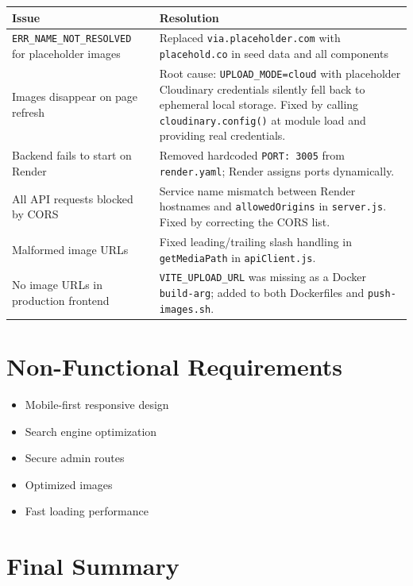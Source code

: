 \documentclass[12pt,a4paper]{article}
\begin{document}
\begin{center}
\begin{tabular}{p{5cm}p{9cm}}
\toprule
Issue & Resolution \\
\midrule
\texttt{ERR\_NAME\_NOT\_RESOLVED} for placeholder images & Replaced \texttt{via.placeholder.com} with \texttt{placehold.co} in seed data and all components \\
Images disappear on page refresh & Root cause: \texttt{UPLOAD\_MODE=cloud} with placeholder Cloudinary credentials silently fell back to ephemeral local storage. Fixed by calling \texttt{cloudinary.config()} at module load and providing real credentials. \\
Backend fails to start on Render & Removed hardcoded \texttt{PORT: 3005} from \texttt{render.yaml}; Render assigns ports dynamically. \\
All API requests blocked by CORS & Service name mismatch between Render hostnames and \texttt{allowedOrigins} in \texttt{server.js}. Fixed by correcting the CORS list. \\
Malformed image URLs & Fixed leading/trailing slash handling in \texttt{getMediaPath} in \texttt{apiClient.js}. \\
No image URLs in production frontend & \texttt{VITE\_UPLOAD\_URL} was missing as a Docker \texttt{build-arg}; added to both Dockerfiles and \texttt{push-images.sh}. \\
\bottomrule
\end{tabular}
\end{center}

\section{Non-Functional Requirements}

\begin{itemize}
    \item Mobile-first responsive design
    \item Search engine optimization
    \item Secure admin routes
    \item Optimized images
    \item Fast loading performance
\end{itemize}

\section{Final Summary}
\end{document}

